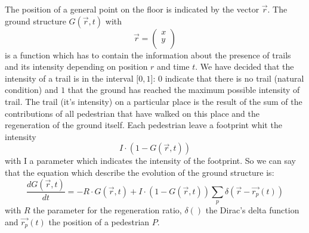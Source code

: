 \documentclass[11pt]{article}
\begin{document}
The position of a general point on the floor is indicated by the vector $\vec{r}$. The ground structure  $G(\vec{r},t)$ with  \[\vec{r} =  \left( \begin{array}{ccc}
x\\
y\\    \end{array} \right)\]
is a function which has to contain the information about the presence of trails and its intensity depending on position $r$ and time $t$. We have decided that the intensity of a trail is in the interval $\lbrack 0, 1 \rbrack$: $0$ indicate that there is no trail (natural condition) and $1$ that the ground has reached the maximum possible intensity of trail. 
The trail (it's intensity) on a particular place is the result of the sum of the contributions of all pedestrian that have walked on this place and the regeneration of the ground itself. 
Each pedestrian leave a footprint whit the intensity 
\[I\cdot(1-G(\vec{r},t))\]
with I a parameter which indicates the intensity of the footprint. 
So we can say that the equation which describe the evolution of the ground structure is:
\[\frac{dG(\vec{r},t)}{dt}=-R \cdot G(\vec{r},t)+I\cdot(1-G(\vec{r},t))\sum_p \delta(\vec{r} - \vec{r_p}(t)) \]
with $R$ the parameter for the regeneration ratio,  $\delta()$ the Dirac’s delta function and $\vec{r_p}(t)$ the position of a pedestrian $P$.

\medskip
\end{document}
